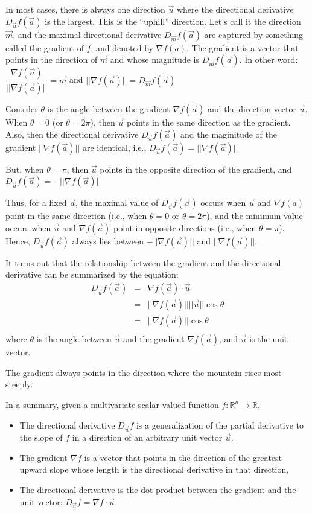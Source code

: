 \documentclass[conference,final,11pt,technote,onecolumn]{IEEEtran}\usepackage[]{graphicx}\usepackage[]{color}
\begin{document}
In most cases, there is always one direction $\vec u$ where the directional derivative $D_{\vec u}f(\vec a)$ is the largest. This is the ``uphill'' direction. Let's call it the direction $\vec m$, and the maximal directional derivative $D_{\vec m}f(\vec a)$ are captured by something called the gradient of $f$, and denoted by $\nabla f(a)$. The gradient is a vector that points in the direction of $\vec m$ and whose magnitude is $D_{\vec m}f(\vec a)$. In other word: $\dfrac{\nabla f(\vec a)}{||\nabla f(\vec a)||} = \vec m$ and $||\nabla f(\vec a)|| = D_{\vec m}f(\vec a)$

Consider $\theta$ is the angle between the gradient $\nabla f(\vec a)$ and the direction vector $\vec u$. When $\theta = 0$ (or $\theta = 2\pi$), then $\vec u$ points in the same direction as the gradient. Also, then the directional derivative $D_{\vec u}f(\vec a)$ and the maginitude of the gradient $||\nabla f(\vec a)||$ are identical, i.e., $D_{\vec u}f(\vec a) = ||\nabla f(\vec a)||$

But, when $\theta = \pi$, then $\vec u$ points in the opposite direction of the gradient, and $D_{\vec u}f(\vec a) = -||\nabla f(\vec a)||$

Thus, for a fixed $\vec a$, the maximal value of $D_{\vec u}f(\vec a)$ occurs when $\vec u$ and $\nabla f(a)$ point in the same direction (i.e., when $\theta = 0$ or $\theta = 2\pi$), and the minimum value occurs when $\vec u$ and $\nabla f(\vec a)$ point in opposite directions (i.e., when $\theta = \pi$). Hence, $D_{\vec u}f(\vec a)$ always lies between $-||\nabla f(\vec a)||$ and $||\nabla f(\vec a)||$.

It turns out that the relationship between the gradient and the directional derivative can be summarized by the equation:
\begin{eqnarray}
\nonumber D_{\vec u}f(\vec a) &=& \nabla f(\vec a) \cdot \vec u\\
\nonumber &=& ||\nabla f(\vec a)|||| \vec u|| \cos\theta\\
\nonumber &=& ||\nabla f(\vec a)|| \cos\theta\\
\end{eqnarray}
where $\theta$ is the angle between $\vec u$ and the gradient $\nabla f(\vec a)$, and $\vec u$ is the unit vector.

The gradient always points in the direction where the mountain rises most steeply.

In a summary, given a multivariate scalar-valued function $f:\mathbb{R}^n\rightarrow \mathbb{R}$,
\begin{itemize}
	\item The directional derivative $D_{\vec u}f$ is a generalization of the partial derivative to the slope of $f$ in a direction of an arbitrary unit vector $\vec u$.
	\item The gradient $\nabla f$ is a vector that points in the direction of the greatest upward slope whose length is the directional derivative in that direction,
	\item The directional derivative is the dot product between the gradient and the unit vector: $D_{\vec u}f = \nabla f \cdot \vec u$
\end{itemize}
\end{document}
